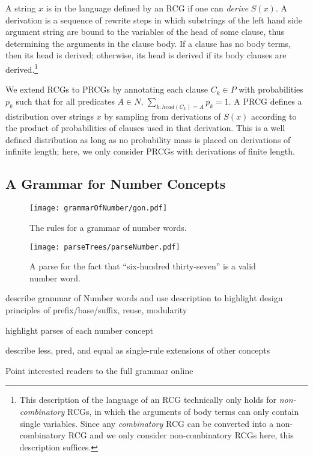 \documentclass[10pt,letterpaper]{article}
\begin{document}
A string $x$ is in the language defined by an RCG if one can
\emph{derive} $S(x)$. A derivation is a sequence of rewrite steps in
which substrings of the left hand side argument string are bound to
the variables of the head of some clause, thus determining the
arguments in the clause body. If a clause has no body terms, then its
head is derived; otherwise, its head is derived if its body clauses
are derived.\footnote{This description of the language of an RCG
  technically only holds for \emph{non-combinatory} RCGs, in which the
  arguments of body terms can only contain single variables. Since any
  \emph{combinatory} RCG can be converted into a non-combinatory RCG
  and we only consider non-combinatory RCGs here, this description
  suffices.}

We extend RCGs to PRCGs by annotating each clause $C_k \in P$ with
probabilities $p_k$ such that for all predicates ${A \in N, \,
  \sum_{k:head(C_k)=A} p_k = 1}$. A PRCG defines a distribution over
strings $x$ by sampling from derivations of $S(x)$ according to the
product of probabilities of clauses used in that derivation. This is a
well defined distribution as long as no probability mass is placed on
derivations of infinite length; here, we only consider PRCGs with
derivations of finite length.

\subsection{A Grammar for Number Concepts}

\begin{figure*}[t]
		\texttt{[image: grammarOfNumber/gon.pdf]}
		\caption{The rules for a grammar of number words.}
		\label{fig:gon}
\end{figure*}

\begin{figure*}[t]
		\texttt{[image: parseTrees/parseNumber.pdf]}
		\caption{A parse for the fact that ``six-hundred thirty-seven'' is a valid number word.}
		\label{fig:parseNumber}
\end{figure*}

describe grammar of Number words and use description to highlight
design principles of prefix/base/suffix, reuse, modularity

highlight parses of each number concept

describe less, pred, and equal as single-rule extensions of other concepts

Point interested readers to the full grammar online
\end{document}
